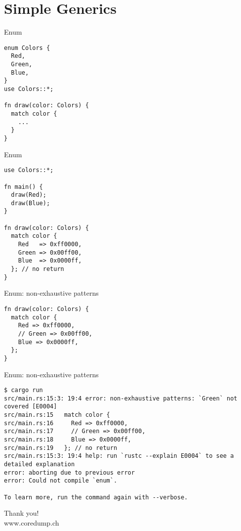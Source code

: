 \documentclass[aspectratio=1610,t]{beamer}
\begin{document}
\section{Simple Generics}
\begin{frame}[fragile]{Enum}
\begin{verbatim}
enum Colors {
  Red,
  Green,
  Blue,
}
use Colors::*;

fn draw(color: Colors) {
  match color {
    ...
  }
}
\end{verbatim}
\end{frame}

\begin{frame}[fragile]{Enum}
\begin{verbatim}
use Colors::*;

fn main() {
  draw(Red);
  draw(Blue);
}

fn draw(color: Colors) {
  match color {
    Red   => 0xff0000,
    Green => 0x00ff00,
    Blue  => 0x0000ff,
  }; // no return
}
\end{verbatim}
\end{frame}


\begin{frame}[fragile]{Enum: non-exhaustive patterns}
\begin{verbatim}
fn draw(color: Colors) {
  match color {
    Red => 0xff0000,
    // Green => 0x00ff00,
    Blue => 0x0000ff,
  };
}
\end{verbatim}
\end{frame}

\begin{frame}[fragile]{Enum: non-exhaustive patterns}
\begin{verbatim}
$ cargo run
src/main.rs:15:3: 19:4 error: non-exhaustive patterns: `Green` not covered [E0004]
src/main.rs:15   match color {
src/main.rs:16     Red => 0xff0000,
src/main.rs:17     // Green => 0x00ff00,
src/main.rs:18     Blue => 0x0000ff,
src/main.rs:19   }; // no return
src/main.rs:15:3: 19:4 help: run `rustc --explain E0004` to see a detailed explanation
error: aborting due to previous error
error: Could not compile `enum`.

To learn more, run the command again with --verbose.
\end{verbatim}
\end{frame}

%
%
%
%
%
%


{
\begin{frame}[standout]
	\begin{centering}
	{\Huge Thank you!}\\
	{\normalsize www.coredump.ch}
	\end{centering}
\end{frame}
}
\end{document}

